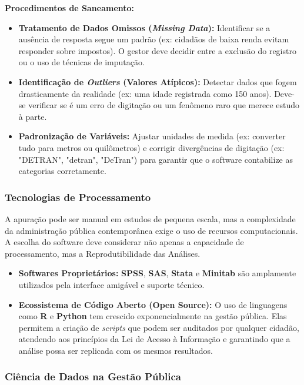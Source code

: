 \textbf{Procedimentos de Saneamento:}

\begin{itemize}
\item \textbf{Tratamento de Dados Omissos (\textit{Missing Data}):} Identificar se a ausência de resposta segue um padrão (ex: cidadãos de baixa renda evitam responder sobre impostos). O gestor deve decidir entre a exclusão do registro ou o uso de técnicas de imputação.
\item \textbf{Identificação de \textit{Outliers} (Valores Atípicos):} Detectar dados que fogem drasticamente da realidade (ex: uma idade registrada como 150 anos). Deve-se verificar se é um erro de digitação ou um fenômeno raro que merece estudo à parte.
\item \textbf{Padronização de Variáveis:} Ajustar unidades de medida (ex: converter tudo para metros ou quilômetros) e corrigir divergências de digitação (ex: "DETRAN", "detran", "DeTran") para garantir que o software contabilize as categorias corretamente.
\end{itemize}

\subsubsection{Tecnologias de Processamento}

A apuração pode ser manual em estudos de pequena escala, mas a complexidade da administração pública contemporânea exige o uso de recursos computacionais. A escolha do software deve considerar não apenas a capacidade de processamento, mas a Reprodutibilidade das Análises.

\begin{itemize}
\item \textbf{Softwares Proprietários:} \textbf{SPSS}, \textbf{SAS}, \textbf{Stata} e \textbf{Minitab} são amplamente utilizados pela interface amigável e suporte técnico.
\item \textbf{Ecossistema de Código Aberto (Open Source):} O uso de linguagens como \textbf{R} e \textbf{Python} tem crescido exponencialmente na gestão pública. Elas permitem a criação de \textit{scripts} que podem ser auditados por qualquer cidadão, atendendo aos princípios da Lei de Acesso à Informação e garantindo que a análise possa ser replicada com os mesmos resultados.
\end{itemize}

\subsubsection{Ciência de Dados na Gestão Pública}

